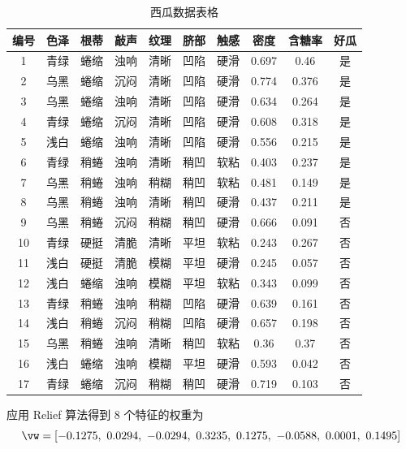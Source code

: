\documentclass[openany]{ctexbook}
\theoremstyle{kaiti}
\theoremstyle{normal}
\begin{document}
\begin{table}[htbp]
  \centering
  \caption{西瓜数据表格}
  \label{tab:wm}
  \begin{tabular}{cccccccccc}
    \toprule
    编号 & 色泽 & 根蒂 & 敲声 & 纹理 & 脐部 & 触感 & 密度    & 含糖率   & 好瓜 \\
    \midrule
    1  & 青绿 & 蜷缩 & 浊响 & 清晰 & 凹陷 & 硬滑 & 0.697 & 0.46  & 是  \\
    2  & 乌黑 & 蜷缩 & 沉闷 & 清晰 & 凹陷 & 硬滑 & 0.774 & 0.376 & 是  \\
    3  & 乌黑 & 蜷缩 & 浊响 & 清晰 & 凹陷 & 硬滑 & 0.634 & 0.264 & 是  \\
    4  & 青绿 & 蜷缩 & 沉闷 & 清晰 & 凹陷 & 硬滑 & 0.608 & 0.318 & 是  \\
    5  & 浅白 & 蜷缩 & 浊响 & 清晰 & 凹陷 & 硬滑 & 0.556 & 0.215 & 是  \\
    6  & 青绿 & 稍蜷 & 浊响 & 清晰 & 稍凹 & 软粘 & 0.403 & 0.237 & 是  \\
    7  & 乌黑 & 稍蜷 & 浊响 & 稍糊 & 稍凹 & 软粘 & 0.481 & 0.149 & 是  \\
    8  & 乌黑 & 稍蜷 & 浊响 & 清晰 & 稍凹 & 硬滑 & 0.437 & 0.211 & 是  \\
    9  & 乌黑 & 稍蜷 & 沉闷 & 稍糊 & 稍凹 & 硬滑 & 0.666 & 0.091 & 否  \\
    10 & 青绿 & 硬挺 & 清脆 & 清晰 & 平坦 & 软粘 & 0.243 & 0.267 & 否  \\
    11 & 浅白 & 硬挺 & 清脆 & 模糊 & 平坦 & 硬滑 & 0.245 & 0.057 & 否  \\
    12 & 浅白 & 蜷缩 & 浊响 & 模糊 & 平坦 & 软粘 & 0.343 & 0.099 & 否  \\
    13 & 青绿 & 稍蜷 & 浊响 & 稍糊 & 凹陷 & 硬滑 & 0.639 & 0.161 & 否  \\
    14 & 浅白 & 稍蜷 & 沉闷 & 稍糊 & 凹陷 & 硬滑 & 0.657 & 0.198 & 否  \\
    15 & 乌黑 & 稍蜷 & 浊响 & 清晰 & 稍凹 & 软粘 & 0.36  & 0.37  & 否  \\
    16 & 浅白 & 蜷缩 & 浊响 & 模糊 & 平坦 & 硬滑 & 0.593 & 0.042 & 否  \\
    17 & 青绿 & 蜷缩 & 沉闷 & 稍糊 & 稍凹 & 硬滑 & 0.719 & 0.103 & 否 \\
    \bottomrule
  \end{tabular}
\end{table}

应用 Relief 算法得到 8 个特征的权重为
\begin{equation}
  \vw=[-0.1275,~0.0294,~-0.0294,~0.3235,~0.1275,~-0.0588,~0.0001,~0.1495]
\end{equation}
\end{document}
